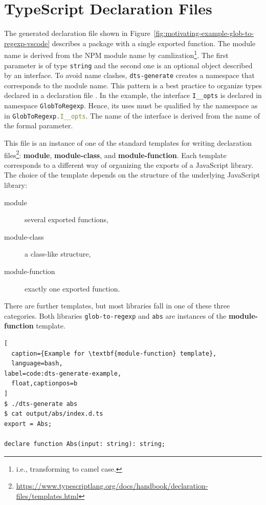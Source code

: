 \documentclass[sigplan,screen]{acmart}
\newcommand{\figref}[1]{Figure~\ref{#1}}
\begin{document}

\section{TypeScript Declaration Files}
\label{sec:typescr-decl-files}

The generated declaration file shown in \figref{fig:motivating-example-glob-to-regexp-vscode}
describes a package with a single exported function. The module name
is derived from the NPM module name by camlization\footnote{i.e.,
  transforming to camel case.}. The first parameter is of type
\texttt{string} and the second one is an optional object described by
an interface. To avoid name clashes, \texttt{dts-generate} creates a
namespace that corresponds to the module name. This pattern is a best
practice to  organize types declared in a declaration file
\cite{typescript-namespaces}. In the example, the interface
\lstinline[language=TypeScript]{I__opts} is declared in namespace
\lstinline[language=TypeScript]{GlobToRegexp}. Hence, its uses
must be qualified by the namespace as in
\lstinline[language=TypeScript]{GlobToRegexp.I__opts}. The name of the
interface is derived from the name of the formal parameter. 

This file is an instance of one of the standard templates for writing
declaration
files\footnote{\url{https://www.typescriptlang.org/docs/handbook/declaration-files/templates.html}}:
\textbf{module}, \textbf{module-class}, and
\textbf{module-function}. 
Each template corresponds to a different way of organizing the exports
of a JavaScript library. The choice of the template depends on the
structure of the underlying JavaScript library:
\begin{description}
\item[module] several exported functions,
\item[module-class] a class-like structure,
\item[module-function] exactly one exported function.
\end{description}
There are further templates, but most libraries fall in one of these
three categories.
Both libraries \texttt{glob-to-regexp} and \texttt{abs} are instances of the
\textbf{module-function} template.

\begin{lstlisting}[
  caption={Example for \textbf{module-function} template},
  language=bash,
label=code:dts-generate-example,
  float,captionpos=b
]
$ ./dts-generate abs
$ cat output/abs/index.d.ts 
export = Abs;

declare function Abs(input: string): string;
\end{lstlisting}
\end{document}
